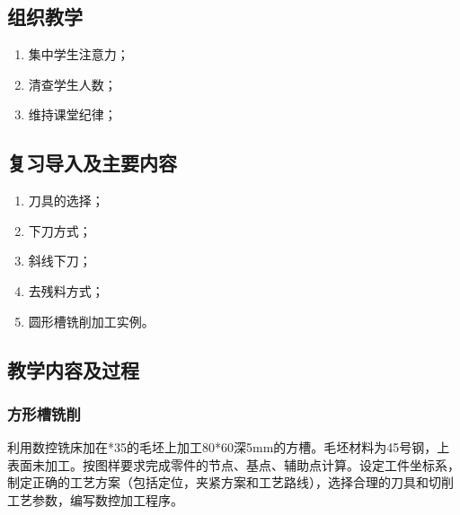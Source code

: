 \jxhj{%
	}

\makeshouye %

\subsection{组织教学}
\begin{enumerate}[\hspace{2em}1、]
	\item 集中学生注意力；
	\item 清查学生人数；
	\item 维持课堂纪律；
\end{enumerate}

\subsection{复习导入及主要内容}
\begin{enumerate}[1、]
\item 刀具的选择；
\item 下刀方式；
\item 斜线下刀；
\item 去残料方式；
\item 圆形槽铣削加工实例。
\end{enumerate}

\subsection{教学内容及过程}
\subsubsection{方形槽铣削}
利用数控铣床加在*35的毛坯上加工80*60深5mm的方槽。毛坯材料为45号钢，上表面未加工。按图样要求完成零件的节点、基点、辅助点计算。设定工件坐标系，制定正确的工艺方案（包括定位，夹紧方案和工艺路线），选择合理的刀具和切削工艺参数，编写数控加工程序。

